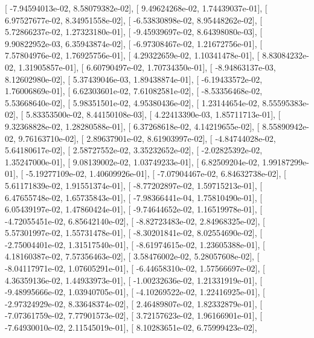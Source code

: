 \documentclass{article}
\begin{document}
       [ -7.94594013e-02,   8.58079382e-02],
       [  9.49624268e-02,   1.74439037e-01],
       [  6.97527677e-02,   8.34951558e-02],
       [ -6.53830898e-02,   8.95448262e-02],
       [  5.72866237e-02,   1.27323180e-01],
       [ -9.45939697e-02,   8.64398080e-03],
       [  9.90822952e-03,   6.35943874e-02],
       [ -6.97308467e-02,   1.21672756e-01],
       [  7.57804976e-02,   1.76925756e-01],
       [  4.29322659e-02,   1.10341478e-01],
       [  8.83084232e-02,   1.31905857e-01],
       [  6.60790497e-02,   1.70734350e-01],
       [ -8.94863137e-03,   8.12602980e-02],
       [  5.37439046e-03,   1.89438874e-01],
       [ -6.19433572e-02,   1.76006869e-01],
       [  6.62303601e-02,   7.61082581e-02],
       [ -8.53356468e-02,   5.53668640e-02],
       [  5.98351501e-02,   4.95380436e-02],
       [  1.23144654e-02,   8.55595383e-02],
       [  5.83353500e-02,   8.44150108e-03],
       [  4.22413390e-03,   1.85711713e-01],
       [  9.32368828e-02,   1.28280588e-01],
       [  6.37268618e-02,   4.14219655e-02],
       [  8.55890942e-02,   9.76163710e-02],
       [  2.89637901e-02,   8.61903997e-02],
       [ -4.84744028e-02,   5.64180617e-02],
       [  2.58727552e-02,   3.35232652e-02],
       [ -2.02825392e-02,   1.35247000e-01],
       [  9.08139002e-02,   1.03749233e-01],
       [  6.82509204e-02,   1.99187299e-01],
       [ -5.19277109e-02,   1.40609926e-01],
       [ -7.07904467e-02,   6.84632738e-02],
       [  5.61171839e-02,   1.91551374e-01],
       [ -8.77202897e-02,   1.59715213e-01],
       [  6.47655748e-02,   1.65735843e-01],
       [ -7.98366441e-04,   1.75810490e-01],
       [  6.05439197e-02,   1.47860424e-01],
       [ -9.74644652e-02,   1.16519978e-01],
       [ -4.72055451e-02,   6.85642140e-02],
       [ -8.82723483e-02,   2.84968325e-02],
       [  5.57301997e-02,   1.55731478e-01],
       [ -8.30201841e-02,   8.02554690e-02],
       [ -2.75004401e-02,   1.31517540e-01],
       [ -8.61974615e-02,   1.23605388e-01],
       [  4.18160387e-02,   7.57356463e-02],
       [  3.58476002e-02,   5.28057608e-02],
       [ -8.04117971e-02,   1.07605291e-01],
       [ -6.44658310e-02,   1.57566697e-02],
       [  4.36359136e-02,   1.44933973e-01],
       [ -1.00232636e-02,   1.21331919e-01],
       [ -9.48995666e-02,   1.03940705e-01],
       [ -4.10269522e-02,   1.22416925e-01],
       [ -2.97324929e-02,   8.33648374e-02],
       [  2.46489807e-02,   1.82332879e-01],
       [ -7.07361759e-02,   7.77901573e-02],
       [  3.72157623e-02,   1.96166901e-01],
       [ -7.64930010e-02,   2.11545019e-01],
       [  8.10283651e-02,   6.75999423e-02],
\end{document}
